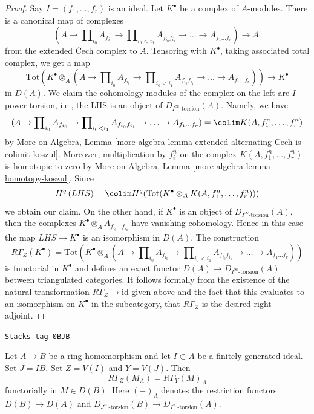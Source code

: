 \begin{proof}
Say $I = (f_1, \ldots, f_r)$ is an ideal.
Let $K^\bullet$ be a complex of $A$-modules.
There is a canonical map of complexes
$$
(A \to \prod\nolimits_{i_0} A_{f_{i_0}} \to
\prod\nolimits_{i_0 < i_1} A_{f_{i_0}f_{i_1}} \to
\ldots \to A_{f_1\ldots f_r}) \longrightarrow A.
$$
from the extended {\v C}ech complex to $A$.
Tensoring with $K^\bullet$, taking associated total complex,
we get a map
$$
\text{Tot}\left(
K^\bullet \otimes_A
(A \to \prod\nolimits_{i_0} A_{f_{i_0}} \to
\prod\nolimits_{i_0 < i_1} A_{f_{i_0}f_{i_1}} \to
\ldots \to A_{f_1\ldots f_r})\right)
\longrightarrow
K^\bullet
$$
in $D(A)$. We claim the cohomology modules of the complex on the left are
$I$-power torsion, i.e., the LHS is an object of
$D_{I^\infty\text{-torsion}}(A)$. Namely, we have
$$
(A \to \prod\nolimits_{i_0} A_{f_{i_0}} \to
\prod\nolimits_{i_0 < i_1} A_{f_{i_0}f_{i_1}} \to
\ldots \to A_{f_1\ldots f_r}) = \colim K(A, f_1^n, \ldots, f_r^n)
$$
by More on Algebra, Lemma
\ref{more-algebra-lemma-extended-alternating-Cech-is-colimit-koszul}.
Moreover, multiplication by $f_i^n$ on the complex
$K(A, f_1^n, \ldots, f_r^n)$ is homotopic to zero by
More on Algebra, Lemma \ref{more-algebra-lemma-homotopy-koszul}.
Since
$$
H^q\left( LHS \right) =
\colim H^q(\text{Tot}(K^\bullet \otimes_A K(A, f_1^n, \ldots, f_r^n)))
$$
we obtain our claim. On the other hand, if $K^\bullet$ is an
object of $D_{I^\infty\text{-torsion}}(A)$, then the complexes
$K^\bullet \otimes_A A_{f_{i_0} \ldots f_{i_p}}$ have vanishing
cohomology. Hence in this case the map $LHS \to K^\bullet$
is an isomorphism in $D(A)$. The construction
$$
R\Gamma_Z(K^\bullet) =
\text{Tot}\left(
K^\bullet \otimes_A
(A \to \prod\nolimits_{i_0} A_{f_{i_0}} \to
\prod\nolimits_{i_0 < i_1} A_{f_{i_0}f_{i_1}} \to
\ldots \to A_{f_1\ldots f_r})\right)
$$
is functorial in $K^\bullet$ and defines an exact functor
$D(A) \to D_{I^\infty\text{-torsion}}(A)$ between
triangulated categories. It follows formally from the
existence of the natural transformation $R\Gamma_Z \to \text{id}$
given above and the fact that this evaluates to an isomorphism
on $K^\bullet$ in the subcategory, that $R\Gamma_Z$ is the desired
right adjoint.
\end{proof}

\begin{lemma}
\label{dualizing-lemma-local-cohomology-and-restriction}
\href{https://stacks.math.columbia.edu/tag/0BJB}{\texttt{Stacks tag 0BJB}}

Let $A \to B$ be a ring homomorphism and let $I \subset A$
be a finitely generated ideal. Set $J = IB$. Set $Z = V(I)$
and $Y = V(J)$. Then
$$
R\Gamma_Z(M_A) = R\Gamma_Y(M)_A
$$
functorially in $M \in D(B)$. Here $(-)_A$ denotes the restriction
functors $D(B) \to D(A)$ and
$D_{J^\infty\text{-torsion}}(B) \to D_{I^\infty\text{-torsion}}(A)$.
\end{lemma}


